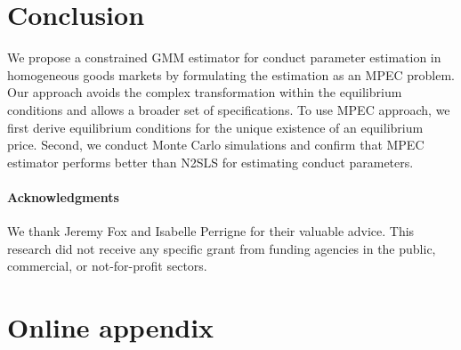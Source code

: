 \documentclass[11pt, a4paper]{article}
\begin{document}
\section{Conclusion}
We propose a constrained GMM estimator for conduct parameter estimation in homogeneous goods markets by formulating the estimation as an MPEC problem.
Our approach avoids the complex transformation within the equilibrium conditions and allows a broader set of specifications. 
To use MPEC approach, we first derive equilibrium conditions for the unique existence of an equilibrium price. 
Second, we conduct Monte Carlo simulations and confirm that MPEC estimator performs better than N2SLS for estimating conduct parameters. 


\paragraph{Acknowledgments}
We thank Jeremy Fox and Isabelle Perrigne for their valuable advice. This research did not receive any specific grant from funding agencies in the public, commercial, or not-for-profit sectors. 

\newpage



\newpage
\appendix

\section{Online appendix}\label{sec:appendix}
\end{document}
